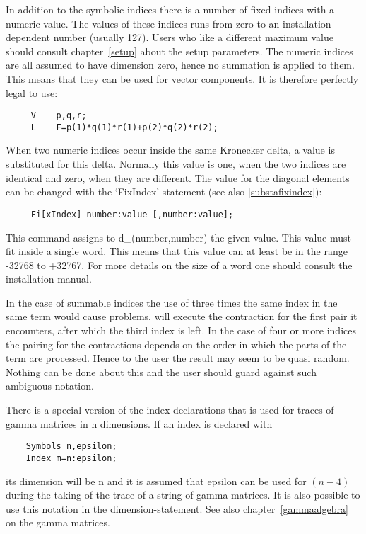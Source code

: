 In addition to the symbolic indices there is a number of fixed 
indices with a numeric value. 
The values of these indices runs from zero to an installation dependent 
number (usually 127). Users who like a different maximum value should 
consult chapter~\ref{setup} about the setup parameters. The numeric indices 
are all assumed to have dimension zero, hence no summation is applied to 
them. This means that they can be used for vector components. It is 
therefore perfectly legal to use:
\begin{verbatim}
     V    p,q,r;
     L    F=p(1)*q(1)*r(1)+p(2)*q(2)*r(2);
\end{verbatim}
When two numeric indices occur inside the same Kronecker delta, a value 
is substituted for this delta. Normally this value is one, when the two 
indices are identical and zero, when they are different. The value for 
the diagonal elements can be changed with the 
`FixIndex'-statement (see also \ref{substafixindex}): 
\begin{verbatim}
     Fi[xIndex] number:value [,number:value];
\end{verbatim}
This command assigns to d\_(number,number) the given value. 
This value must fit inside a single {\FORM} word. This means that this 
value can at least be in the range -32768 to +32767. For more 
details on the size of a {\FORM} word one should consult the 
installation manual. 

In the case of summable indices the use of three 
times the same index in the same term would cause problems. {\FORM} will 
execute the contraction for the first pair it encounters, after which the 
third index is left. In the case of four or more indices the pairing for 
the contractions depends on the order in which the parts of the term are 
processed. Hence to the user the result may seem to be quasi random. 
Nothing can be done about this and the user should guard against such 
ambiguous notation.

There is a special version of the index declarations that is used for 
traces of gamma 
matrices in n dimensions. If an index is declared with
\begin{verbatim}
    Symbols n,epsilon;
    Index m=n:epsilon;
\end{verbatim}
its dimension will be n and it is assumed that epsilon can be used for 
$(n-4)$ during the taking of the trace of a string of gamma matrices. It 
is also possible to use this notation in the dimension-statement. See 
also chapter~\ref{gammaalgebra} on the gamma matrices.

